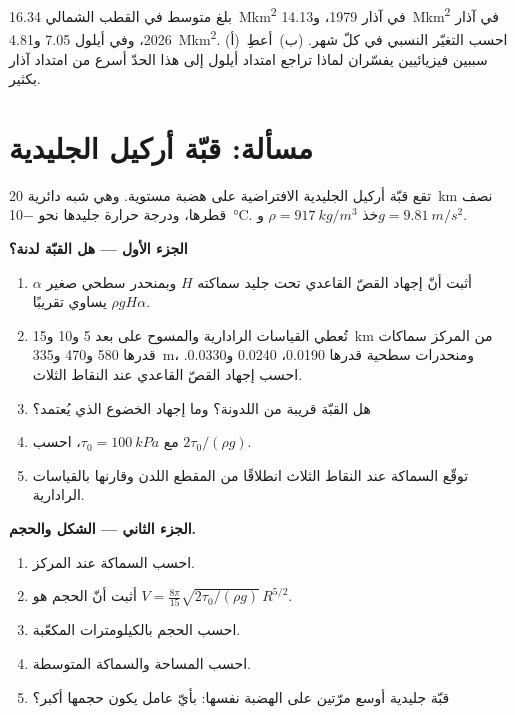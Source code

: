 \begin{exercise}[$\star\star\star$]\label{exo:b3:glaciology:12}
بلغ متوسط  في القطب الشمالي \qty{16.34}{\mega km^2} في آذار 1979،
و\qty{14.13}{\mega km^2} في آذار 2026، وفي أيلول \num{7.05}
و\qty{4.81}{\mega km^2}. (أ)~احسب التغيّر النسبي في كلّ شهر.
(ب)~أعطِ سببين فيزيائيين يفسّران لماذا تراجع امتداد أيلول إلى هذا الحدّ
أسرع من امتداد آذار بكثير.
\end{exercise}

\section{مسألة: قبّة أركيل الجليدية}

\begin{problem}
\label{pb:b3:glaciology:1}
تقع قبّة أركيل الجليدية الافتراضية على هضبة مستوية. وهي شبه دائرية
\qty{20}{km} نصف قطرها، ودرجة حرارة جليدها نحو \qty{-10}{\celsius}. خذ
$\rho = \qty{917}{kg/m^3}$ و$g = \qty{9.81}{m/s^2}$.

\medskip\noindent\textbf{الجزء الأول --- هل القبّة لدنة؟}
\begin{enumerate}
\item أثبت أنّ إجهاد القصّ القاعدي تحت جليد سماكته $H$ وبمنحدر سطحي صغير
  $\alpha$ يساوي تقريبًا $\rho gH\alpha$.
\item تُعطي القياسات الرادارية والمسوح على بعد 5 و10 و\qty{15}{km} من المركز
  سماكات قدرها 580 و470 و\qty{335}{m}، ومنحدرات سطحية قدرها
  \num{0.0190}، \num{0.0240} و\num{0.0330}. احسب إجهاد القصّ القاعدي
  عند النقاط الثلاث.
\item هل القبّة قريبة من اللدونة؟ وما إجهاد الخضوع الذي يُعتمد؟
\item مع $\tau_0 = \qty{100}{kPa}$، احسب $2\tau_0/(\rho g)$.
\item توقّع السماكة عند النقاط الثلاث انطلاقًا من المقطع اللدن
  وقارنها بالقياسات الرادارية.
\end{enumerate}

\medskip\noindent\textbf{الجزء الثاني --- الشكل والحجم.}
\begin{enumerate}[resume]
\item احسب السماكة عند المركز.
\item أثبت أنّ الحجم هو $V = \frac{8\pi}{15}\sqrt{2\tau_0/(\rho
  g)}\,R^{5/2}$.
\item احسب الحجم بالكيلومترات المكعّبة.
\item احسب المساحة والسماكة المتوسطة.
\item قبّة جليدية أوسع مرّتين على الهضبة نفسها: بأيّ عامل
  يكون حجمها أكبر؟
\end{enumerate}


\end{problem}
